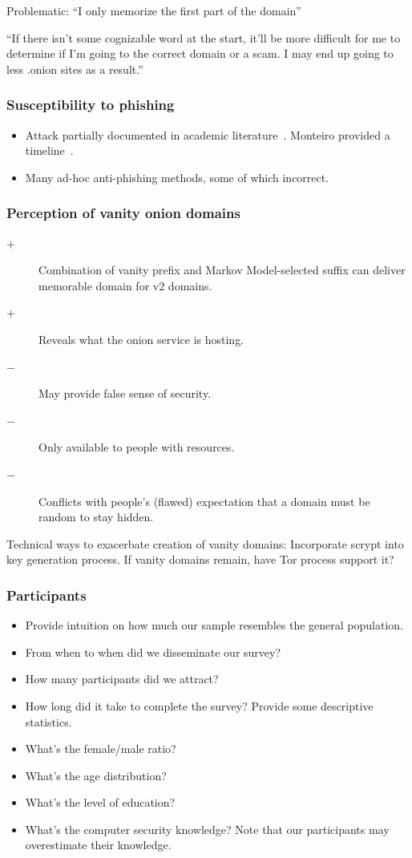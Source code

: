 Problematic:
``I only memorize the first part of the domain''

``If there isn't some cognizable word at the start, it'll be more difficult for
me to determine if I'm going to the correct domain or a scam. I may end up going
to less .onion sites as a result.''

\subsubsection{Susceptibility to phishing}
\begin{itemize}
    \item Attack partially documented in academic
        literature~\cite[\S~5.1]{Winter2016a}.  Monteiro provided a
        timeline~\cite{Monteiro2016a}.
    \item Many ad-hoc anti-phishing methods, some of which incorrect.
\end{itemize}

\subsubsection{Perception of vanity onion domains}
\begin{description}
    \item[$+$] Combination of vanity prefix and Markov Model-selected suffix can
        deliver memorable domain for v2 domains.
    \item[$+$] Reveals what the onion service is hosting.
    \item[$-$] May provide false sense of security.
    \item[$-$] Only available to people with resources.
    \item[$-$] Conflicts with people's (flawed) expectation that a domain must
        be random to stay hidden.
\end{description}

Technical ways to exacerbate creation of vanity domains: Incorporate scrypt into
key generation process.
If vanity domains remain, have Tor process support it?

\subsubsection{Participants}
\begin{itemize}
    \item Provide intuition on how much our sample resembles the general
        population.
    \item From when to when did we disseminate our survey?
    \item How many participants did we attract?
    \item How long did it take to complete the survey?  Provide some descriptive statistics.
    \item What's the female/male ratio?
    \item What's the age distribution?
    \item What's the level of education?
    \item What's the computer security knowledge?  Note that our participants
        may overestimate their knowledge.
\end{itemize}


